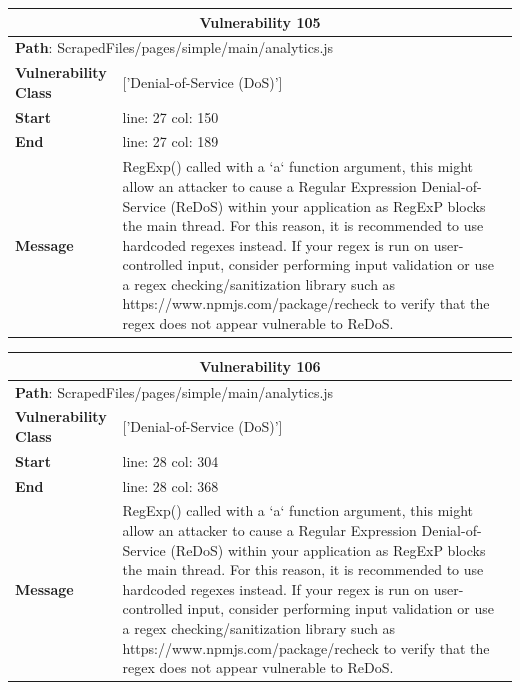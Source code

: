 \documentclass[12pt]{article}
\begin{document}
\vspace{0.7cm}
\FloatBarrier
\begin{table}[!h]
\centering
\renewcommand{\arraystretch}{1.3}
\begin{tabular}{|l|p{10cm}|}
\hline
\multicolumn{2}{|c|}{\textbf{Vulnerability 105}} \\
\hline
\multicolumn{2}{|l|}{\textbf{Path}: ScrapedFiles/pages/simple/main/analytics.js} \\
\hline
\textbf{Vulnerability Class} & ['Denial-of-Service (DoS)'] \\
\hline
\textbf{Start} & line: 27 \quad col: 150 \\
\hline
\textbf{End} & line: 27 \quad col: 189 \\
\hline
\textbf{Message} & RegExp() called with a `a` function argument, this might allow an attacker to cause a Regular Expression Denial-of-Service (ReDoS) within your application as RegExP blocks the main thread. For this reason, it is recommended to use hardcoded regexes instead. If your regex is run on user-controlled input, consider performing input validation or use a regex checking/sanitization library such as https://www.npmjs.com/package/recheck to verify that the regex does not appear vulnerable to ReDoS. \\
\hline
\end{tabular}
\end{table}
\vspace{0.7cm}
\FloatBarrier
\begin{table}[!h]
\centering
\renewcommand{\arraystretch}{1.3}
\begin{tabular}{|l|p{10cm}|}
\hline
\multicolumn{2}{|c|}{\textbf{Vulnerability 106}} \\
\hline
\multicolumn{2}{|l|}{\textbf{Path}: ScrapedFiles/pages/simple/main/analytics.js} \\
\hline
\textbf{Vulnerability Class} & ['Denial-of-Service (DoS)'] \\
\hline
\textbf{Start} & line: 28 \quad col: 304 \\
\hline
\textbf{End} & line: 28 \quad col: 368 \\
\hline
\textbf{Message} & RegExp() called with a `a` function argument, this might allow an attacker to cause a Regular Expression Denial-of-Service (ReDoS) within your application as RegExP blocks the main thread. For this reason, it is recommended to use hardcoded regexes instead. If your regex is run on user-controlled input, consider performing input validation or use a regex checking/sanitization library such as https://www.npmjs.com/package/recheck to verify that the regex does not appear vulnerable to ReDoS. \\
\hline
\end{tabular}
\end{table}
\end{document}
